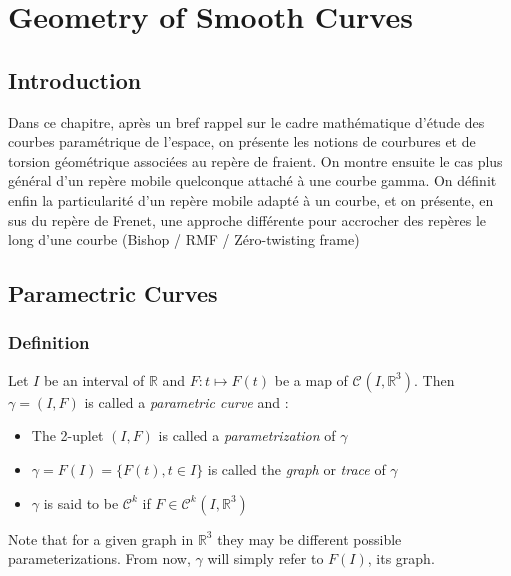 \chapter{Geometry of Smooth Curves}
\section{Introduction}
Dans ce chapitre, après un bref rappel sur le cadre mathématique d'étude des courbes paramétrique de l'espace, on présente les notions de courbures et de torsion géométrique associées au repère de fraient. On montre ensuite le cas plus général d'un repère mobile quelconque attaché à une courbe gamma. On définit enfin la particularité d'un repère mobile adapté à un courbe, et on présente, en sus du repère de Frenet, une approche différente pour accrocher des repères le long d'une courbe (Bishop / RMF / Zéro-twisting frame)



\section{Paramectric Curves}

\subsection{Definition}
Let $I$ be an interval of $\mathbb{R}$ and $F\colon t \mapsto F(t)$ be a map of ${\mathcal{C}}^{}(I,{\mathbb{R}}^3)$. Then $\gamma=(I,F)$ is called a \emph{parametric curve} and :
\begin{itemize}
\item The 2-uplet $(I,F)$ is called a \emph{parametrization} of $\gamma$
\item $\gamma = F(I) = \{F(t), t \in I\}$ is called the \emph{graph} or \emph{trace} of $\gamma$
\item $\gamma$ is said to be ${\mathcal{C}}^{k}$ if $F \in {\mathcal{C}^{k}}^{}(I,{\mathbb{R}}^3)$
\end{itemize}
\smallskip
\begin{myrk}
Note that for a given graph in ${\mathbb{R}}^3$ they may be different possible parameterizations. From now, $\gamma$ will simply refer to $F(I)$, its graph.
\end{myrk}

